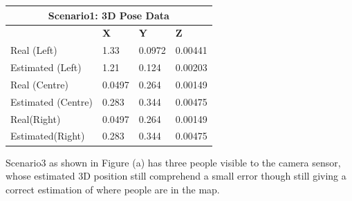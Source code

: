 \begin{table}[H]
  \centering
  \begin{tabular}{ |p{4cm}|p{2cm}|p{2cm}|p{2cm}|  }
    \hline
    \multicolumn{4}{|c|}{Scenario1: 3D Pose Data} \\
    \hline
    & \textbf{X} & \textbf{Y} & \textbf{Z} \\
    \hline
    Real (Left) & 1.33 & 0.0972 & 0.00441 \\
    Estimated (Left) & 1.21 & 0.124 & 0.00203 \\
    \hline
    Real (Centre) & 0.0497 & 0.264 & 0.00149 \\
    Estimated (Centre) & 0.283 & 0.344 & 0.00475 \\
    \hline
    Real(Right) & 0.0497 & 0.264 & 0.00149 \\
    Estimated(Right) & 0.283 & 0.344 & 0.00475 \\
    \hline
  \end{tabular}
\end{table}

Scenario3 as shown in Figure (a) has three people visible to the camera sensor, whose estimated 3D position still comprehend a small error though still giving a correct estimation of where people are in the map.
